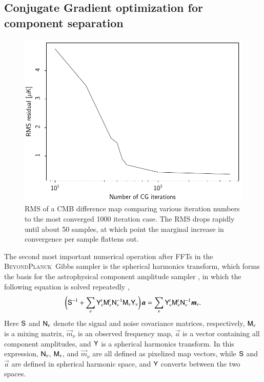 \documentclass[twocolumn]{aa}
\newcommand{\Y}[0]{\tens{Y}}
\renewcommand{\a}[0]{\vec{a}}
\newcommand{\m}[0]{\vec{m}}
\newcommand{\N}[0]{\tens{N}}
\newcommand{\M}[0]{\tens{M}}
\renewcommand{\S}[0]{\tens{S}}
\newcommand{\BP}{\textsc{BeyondPlanck}}
\begin{document}
\subsection{Conjugate Gradient optimization for component separation}
\label{sec:cg}

\begin{figure}[t]
  \center
  \includegraphics[width=\linewidth]{figs/cmb_rms_diff.pdf}
  \caption{RMS of a CMB difference map comparing various iteration numbers to the most converged 1000 iteration case. The RMS drops rapidly until about 50 samples, at which point the marginal increase in convergence per sample flattens out.
  }\label{fig:rmsiterations}
\end{figure}

The second most important numerical operation after FFTs in the
\BP\ Gibbs sampler is the spherical harmonics transform, which forms
the basis for the astrophysical component amplitude sampler
\citep{BP13}, in which the following equation is solved repeatedly
\citep{seljebotn:2019},
\begin{equation}
\biggl(\S^{-1} +
\sum_{\nu}\Y^t_{\nu}\M^t_{\nu}\N_{\nu}^{-1}\M_{\nu}\Y_{\nu}\biggr)\,\a
= \sum_\nu\Y_{\nu}^t\M_\nu^t\N_\nu^{-1}\m_{\nu}.
\label{eq:wiener}
\end{equation}
Here $\S$ and $\N_\nu$ denote the signal and noise covariance
matrices, respectively, $\M_{\nu}$ is a mixing matrix, $\m_{\nu}$ is
an observed frequency map, $\a$ is a vector containing all component
amplitudes, and $\Y$ is a spherical harmonics transform. In this
expression, $\N_{\nu}$, $\M_{\nu}$, and $\m_{\nu}$ are all defined as
pixelized map vectors, while $\S$ and $\a$ are defined in spherical
harmonic space, and $\Y$ converts between the two spaces.
\end{document}
